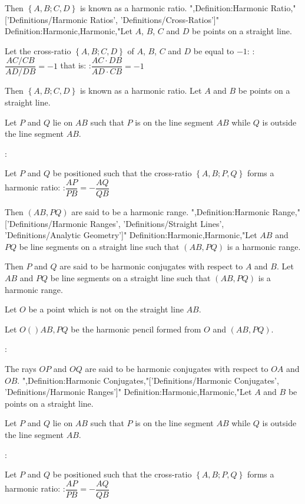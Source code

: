 Then $\left\lbrace A, B; C, D \right\rbrace$ is known as a harmonic ratio.
",Definition:Harmonic Ratio,"['Definitions/Harmonic Ratios', 'Definitions/Cross-Ratios']"
Definition:Harmonic,Harmonic,"Let $A$, $B$, $C$ and $D$ be points on a straight line.

Let the cross-ratio $\left\lbrace A, B; C, D \right\rbrace$ of $A$, $B$, $C$ and $D$ be equal to $-1$:
:$\dfrac {AC / CB} {AD / DB} = -1$
that is:
:$\dfrac {AC \cdot DB} {AD \cdot CB} = -1$


Then $\left\lbrace A, B; C, D \right\rbrace$ is known as a harmonic ratio.
Let $A$ and $B$ be points on a straight line.

Let $P$ and $Q$ lie on $AB$ such that $P$ is on the line segment $AB$ while $Q$ is outside the line segment $AB$.


:


Let $P$ and $Q$ be positioned such that the cross-ratio $\left\lbrace A, B; P, Q \right\rbrace$ forms a harmonic ratio:
:$\dfrac {AP} {PB} = -\dfrac {AQ} {QB}$


Then $\left( AB, PQ \right)$ are said to be a harmonic range.
",Definition:Harmonic Range,"['Definitions/Harmonic Ranges', 'Definitions/Straight Lines', 'Definitions/Analytic Geometry']"
Definition:Harmonic,Harmonic,"Let $AB$ and $PQ$ be line segments on a straight line such that $\left( AB, PQ \right)$ is a harmonic range.

Then $P$ and $Q$ are said to be harmonic conjugates with respect to $A$ and $B$.
Let $AB$ and $PQ$ be line segments on a straight line such that $\left( AB, PQ \right)$ is a harmonic range.

Let $O$ be a point which is not on the straight line $AB$.

Let $O \left(   \right){AB, PQ}$ be the harmonic pencil formed from $O$ and $\left( AB, PQ \right)$.


:


The rays $OP$ and $OQ$ are said to be harmonic conjugates with respect to $OA$ and $OB$.
",Definition:Harmonic Conjugates,"['Definitions/Harmonic Conjugates', 'Definitions/Harmonic Ranges']"
Definition:Harmonic,Harmonic,"Let $A$ and $B$ be points on a straight line.

Let $P$ and $Q$ lie on $AB$ such that $P$ is on the line segment $AB$ while $Q$ is outside the line segment $AB$.


:


Let $P$ and $Q$ be positioned such that the cross-ratio $\left\lbrace A, B; P, Q \right\rbrace$ forms a harmonic ratio:
:$\dfrac {AP} {PB} = -\dfrac {AQ} {QB}$


